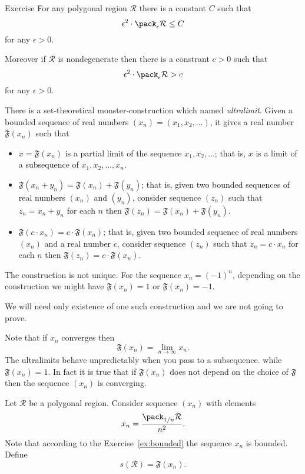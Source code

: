 {\begin{thm}{Exercise}\label{ex:bounded}
For any polygonal region $\mathcal R$ there is a constant $C$ such that
$$\epsilon^2\cdot\pack_\epsilon \mathcal R\le C$$
for any $\epsilon>0$.

Moreover if $\mathcal R$ is nondegenerate then there is a constrant $c>0$ such that 
$$\epsilon^2\cdot\pack_\epsilon \mathcal R> c$$
for any $\epsilon>0$.
\end{thm}

There is a set-theoretical monster-construction
which named \emph{ultralimit}.
Given a bounded sequence of real numbers $(x_n)=(x_1,x_2,\dots)$,
it gives a real number $\mathfrak{F}(x_n)$ such that
\begin{itemize}
\item $x=\mathfrak{F}(x_n)$ is a partial limit of the sequence $x_1,x_2,\dots$; 
that is, $x$ is a limit of a subsequence of $x_1,x_2,\dots,x_n$.
\item $\mathfrak{F}(x_n+y_n)=\mathfrak{F}(x_n)+\mathfrak{F}(y_n)$;
that is, given two bounded sequences of real numbers $(x_n)$ and $(y_n)$, consider sequence $(z_n)$ such that $z_n=x_n+y_n$ for each $n$ then $\mathfrak{F}(z_n)=\mathfrak{F}(x_n)+\mathfrak{F}(y_n)$.
\item $\mathfrak{F}(c\cdot x_n)=c\cdot \mathfrak{F}(x_n)$;
that is, given two bounded sequence of real numbers $(x_n)$ and a real number $c$, consider sequence $(z_n)$ such that $z_n=c\cdot x_n$ for each $n$ then $\mathfrak{F}(z_n)=c\cdot \mathfrak{F}(x_n)$.
\end{itemize}

The construction is not unique. 
For the sequence $x_n=(-1)^n$,
depending on the construction we might have $\mathfrak{F}(x_n)=1$ or $\mathfrak{F}(x_n)=-1$.

We will need only existence of one such construction
and we are not going to prove. %

Note that if $x_n$ converges then
$$\mathfrak{F}(x_n)=\lim_{n\to\infty} x_n.$$
The ultralimits behave unpredictably when you pass to a subsequence.
 while
$\mathfrak{F}(x_n)=1$.
In fact it is true that if $\mathfrak{F}(x_n)$ does not depend on the choice of  $\mathfrak{F}$ then the sequence $(x_n)$ is converging.

Let $\mathcal R$ be a polygonal region.
Consider sequence $(x_n)$ with elements
$$x_n=\frac{\pack_{1/n} \mathcal R}{n^2}.$$
Note that according to the Exercise~\ref{ex:bounded} the sequence $x_n$ is bounded.
Define 
$$s(\mathcal R)=\mathfrak{F}(x_n).$$

}

